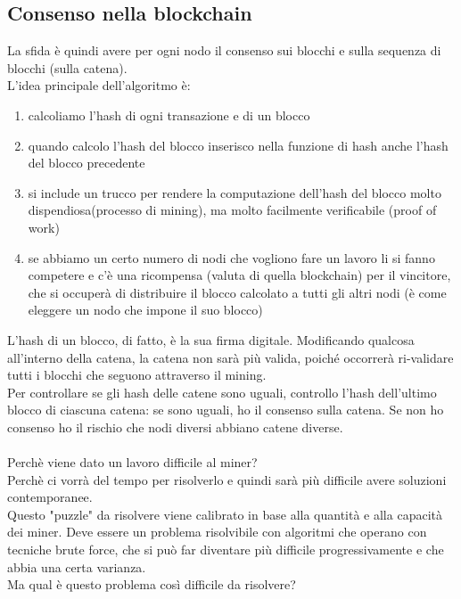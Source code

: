 \subsection{Consenso nella blockchain}
La sfida è quindi avere per ogni nodo il consenso sui blocchi e sulla sequenza di blocchi (sulla catena).\\
L'idea principale dell'algoritmo è:
\begin{enumerate}
    \item calcoliamo l'hash di ogni transazione e di un blocco
    \item quando calcolo l'hash del blocco inserisco nella funzione di hash anche l'hash del blocco precedente
    \item si include un trucco per rendere la computazione dell'hash del blocco molto dispendiosa(processo di mining), ma molto facilmente verificabile (proof of work)
    \item  se abbiamo un certo numero di nodi che vogliono fare un lavoro li si fanno competere e c'è una ricompensa (valuta di quella blockchain) per il vincitore, che si occuperà di distribuire il blocco calcolato a tutti gli altri nodi (è come eleggere un nodo che impone il suo blocco)
\end{enumerate}
L'hash di un blocco, di fatto, è la sua firma digitale. Modificando qualcosa all'interno della catena, la catena non sarà più valida, poiché occorrerà ri-validare tutti i blocchi che seguono attraverso il mining. \\
Per controllare se gli hash delle catene sono uguali, controllo l'hash dell'ultimo blocco di ciascuna catena: se sono uguali, ho il consenso sulla catena. Se non ho consenso ho il rischio che nodi diversi abbiano catene diverse.\\\\
Perchè viene dato un lavoro difficile al miner? \\
Perchè ci vorrà del tempo per risolverlo e quindi sarà più difficile avere soluzioni contemporanee. \\
Questo "puzzle" da risolvere viene calibrato in base alla quantità e alla capacità dei miner. Deve essere un problema risolvibile con algoritmi che operano con tecniche brute force, che si può far diventare più difficile progressivamente e che abbia una certa varianza.\\
Ma qual è questo problema così difficile da risolvere?

